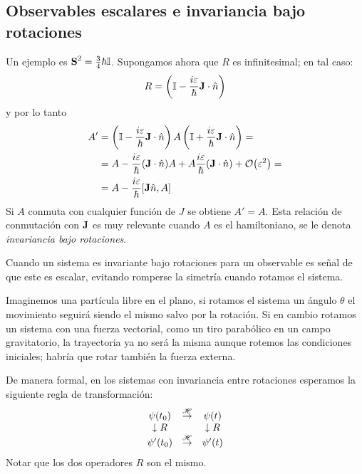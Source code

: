 \subsection{Observables escalares e invariancia bajo rotaciones}
Un ejemplo es $\bm{\mathrm{S}}^2 = \frac{3}{4} \hbar \mathbb{I}$.
Supongamos ahora que $R$ es infinitesimal; en tal caso:
\begin{equation}
  R = \left( \mathbb{I} - \frac{i\varepsilon}{\hbar}\bm{\mathrm{J}}\cdot\hat{n} \right)
\end{equation}
y por lo tanto
\begin{equation}
  \begin{split}
    A' &= \left( \mathbb{I} - \frac{i\varepsilon}{\hbar} \boldrm{J}\cdot
      \hat{n} \right) A \left( \mathbb{I} + \frac{i\varepsilon}{\hbar}
      \boldrm{J}\cdot \hat{n} \right) = \\
    &= A - \frac{i\varepsilon}{\hbar}(\boldrm{J}\cdot\hat{n})A + A
    \frac{i\varepsilon}{\hbar}(\boldrm{J}\cdot\hat{n}) +
    \order{\varepsilon^2} = \\
    &= A - \frac{i\varepsilon}{\hbar} [\boldrm{J}\hat{n},A]
  \end{split}
\end{equation}
Si $A$ conmuta con cualquier función de $J$ se obtiene $A'= A$. Esta
relación de conmutación con $\bm{\mathrm{J}}$ es muy relevante cuando $A$
es el hamiltoniano, se le denota \emph{invariancia bajo rotaciones}.

Cuando un sistema es invariante bajo rotaciones para un observable es
señal de que este es escalar, evitando romperse la simetría cuando
rotamos el sistema. 

Imaginemos una partícula libre en el plano, si rotamos el sistema un
ángulo $\theta$ el movimiento seguirá siendo el mismo salvo por la
rotación. Si en cambio rotamos un sistema con una fuerza vectorial,
como un tiro parabólico en un campo gravitatorio, la trayectoria ya no
será la misma aunque rotemos las condiciones iniciales; habría que
rotar también la fuerza externa.

De manera formal, en los sistemas con invariancia entre rotaciones
esperamos la siguiente regla de transformación:
\begin{equation*}
  \begin{matrix}
    \psi(t_0) & \stackrel{ \mathscr{H} }{\rightarrow} & \psi(t) \\
    \downarrow R & & \downarrow R \\
    \psi'(t_0) & \stackrel{ \mathscr{H} }{\rightarrow} & \psi'(t)
  \end{matrix}
\end{equation*}
Notar que los dos operadores $R$ son el mismo.

